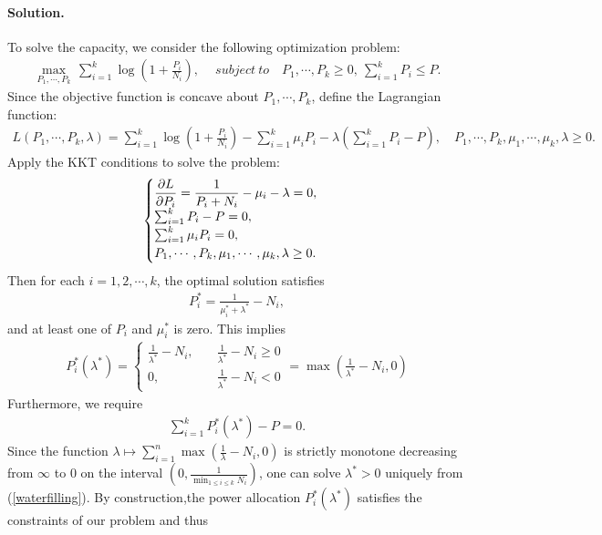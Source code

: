 \documentclass{article}
\numberwithin{equation}{section}
\theoremstyle{plain}
\theoremstyle{definition}
\begin{document}
\paragraph{Solution.} To solve the capacity, we consider the following optimization problem:
\begin{align*}
	\max_{P_1,\cdots,P_k}\,\sum_{i=1}^k\log\left(1+\frac{P_i}{N_i}\right),\quad\ subject\ to\quad P_1,\cdots,P_k\geq 0,\ \sum_{i=1}^k P_i\leq P.
\end{align*}
Since the objective function is concave about $P_1,\cdots,P_k$, define the Lagrangian function:
\begin{align*}
	L(P_1,\cdots,P_k,\lambda)=\sum_{i=1}^k\log\left(1+\frac{P_i}{N_i}\right)-\sum_{i=1}^k\mu_i P_i-\lambda\left(\sum_{i=1}^k P_i-P\right),\quad P_1,\cdots,P_k,\mu_1,\cdots,\mu_k,\lambda\geq 0.
\end{align*}
Apply the KKT conditions to solve the problem:
\begin{align*}
\begin{cases}
\displaystyle\frac{\partial L}{\partial P_i}=\frac{1}{P_i+N_i}-\mu_i-\lambda =0,\\
\vspace{-0.5cm}\\
\sum_{i=1}^k P_i-P=0,\\
\sum_{i=1}^k \mu_i P_i=0,\\
P_1,\cdots,P_k,\mu_1,\cdots,\mu_k,\lambda\geq 0.
\end{cases}
\end{align*}
Then for each $i=1,2,\cdots,k$, the optimal solution satisfies
\begin{align*}
	P_i^*=\frac{1}{\mu_i^*+\lambda^*}-N_i,
\end{align*}
and at least one of $P_i$ and $\mu_i^*$ is zero. This implies
\begin{align*}
P_i^*(\lambda^*)=\begin{cases}
\displaystyle \frac{1}{\lambda^*}-N_i,\quad &\frac{1}{\lambda^*}-N_i\geq 0\\
\displaystyle 0,\quad &\frac{1}{\lambda^*}-N_i<0
\end{cases}=\max\left(\frac{1}{\lambda^*}-N_i, 0\right)
\end{align*}
Furthermore, we require
\begin{align}
	\sum_{i=1}^k P_i^*(\lambda^*)-P=0.\label{waterfilling}
\end{align}
Since the function $\lambda\mapsto\sum_{i=1}^n\max\left(\frac{1}{\lambda}-N_i,0\right)$ is strictly monotone decreasing from $\infty$ to $0$ on the interval $(0,\frac{1}{\min_{1\leq i\leq k} N_i})$, one can solve $\lambda^*>0$ uniquely from (\ref{waterfilling}). By construction,the power allocation $P_i^*(\lambda^*)$ satisfies the constraints of our problem and thus
\end{document}
